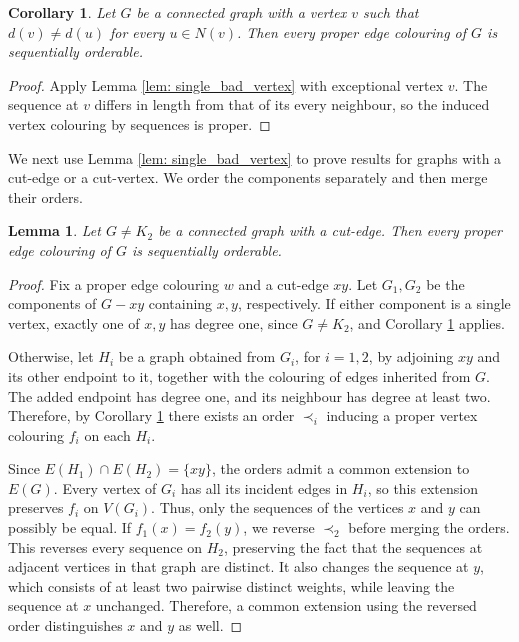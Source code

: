 \documentclass[a4paper,12pt]{elsarticle}
\newtheorem{corollary}[theorem]{Corollary}
\newtheorem{lemma}[theorem]{Lemma}
\begin{document}
\begin{corollary} Let $G$ be a connected graph with a vertex $v$ such that $d(v)\neq d(u)$ for every $u\in N(v)$. Then every proper edge colouring of $G$ is sequentially orderable. \label{cor: unique_degree}
\end{corollary}
\begin{proof}
    Apply Lemma \ref{lem: single_bad_vertex} with exceptional vertex $v$. The sequence at $v$ differs in length from that of its every neighbour, so the induced vertex colouring by sequences is proper.
\end{proof}

We next use Lemma \ref{lem: single_bad_vertex} to prove results for graphs with a cut-edge or a cut-vertex. We order the components separately and then merge their orders.

\begin{lemma} Let $G\neq K_2$ be a connected graph with a cut-edge. Then every proper edge colouring of $G$ is sequentially orderable. \label{lem: cut-edge}
\end{lemma}
\begin{proof}
    Fix a proper edge colouring $w$ and a cut-edge $xy$. Let $G_1,G_2$ be the components of $G-xy$ containing $x,y$, respectively. If either component is a single vertex, exactly one of $x,y$ has degree one, since $G\neq K_2$, and Corollary \ref{cor: unique_degree} applies.

    Otherwise, let $H_i$ be a graph obtained from $G_i$, for $i=1,2$, by adjoining $xy$ and its other endpoint to it, together with the colouring of edges inherited from $G$. The added endpoint has degree one, and its neighbour has degree at least two. Therefore, by Corollary \ref{cor: unique_degree} there exists an order $\prec_i$ inducing a proper vertex colouring $f_i$ on each $H_i$.

    Since $E(H_1)\cap E(H_2)=\{xy\}$, the orders admit a common extension to $E(G)$. Every vertex of $G_i$ has all its incident edges in $H_i$, so this extension preserves $f_i$ on $V(G_i)$. Thus, only the sequences of the vertices $x$ and $y$ can possibly be equal. If $f_1(x)=f_2(y)$, we reverse $\prec_2$ before merging the orders. This reverses every sequence on $H_2$, preserving the fact that the sequences at adjacent vertices in that graph are distinct. It also changes the sequence at $y$, which consists of at least two pairwise distinct weights, while leaving the sequence at $x$ unchanged. Therefore, a common extension using the reversed order distinguishes $x$ and $y$ as well.
\end{proof}
\end{document}
